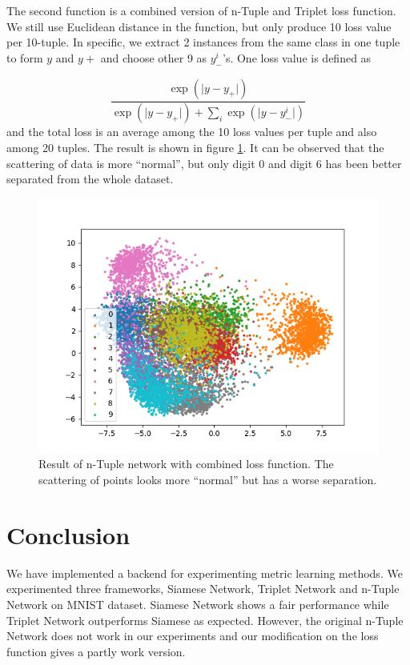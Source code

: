 \documentclass[10pt,twocolumn,letterpaper]{article}
\begin{document}
			The second function is a combined version of n-Tuple and Triplet loss function. We still use Euclidean distance in the function, but only produce 10 loss value per 10-tuple. In specific, we extract 2 instances from the same class in one tuple to form $y$ and $y+$ and choose other 9 as $y_-^i$'s. One loss value is defined as
			
			\begin{equation}
				\frac{\exp{(\lvert y-y_+ \rvert)}}{\exp{(\lvert y-y_+ \rvert)} + \sum_i\exp{(\lvert y-y_-^i \rvert)}}
			\end{equation}
			and the total loss is an average among the 10 loss values per tuple and also among 20 tuples. The result is shown in figure \ref{fig:second_tuple}. It can be observed that the scattering of data is more ``normal'', but only digit 0 and digit 6 has been better separated from the whole dataset.
			
			\begin{figure}[htbp]
				\begin{center}
					\includegraphics[width=0.9\linewidth]{second_tuple}
				\end{center}
				\caption{Result of n-Tuple network with combined loss function. The scattering of points looks more ``normal'' but has a worse separation.\label{fig:second_tuple}}
			\end{figure}
	
	\section{Conclusion \label{sec:Conc}}
		We have implemented a backend for experimenting metric learning methods. We experimented three frameworks, Siamese Network, Triplet Network and n-Tuple Network on MNIST dataset. Siamese Network shows a fair performance while Triplet Network outperforms Siamese as expected. However, the original n-Tuple Network does not work in our experiments and our modification on the loss function gives a partly work version.
	{\small
		
		
	}
	
\end{document}
